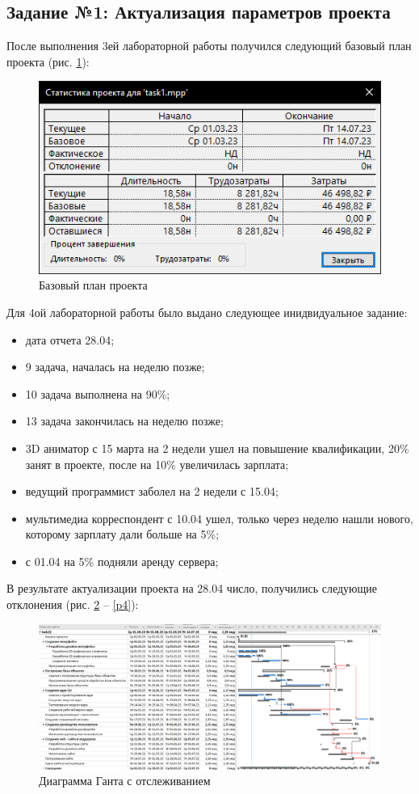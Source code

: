 \newpage
\subsection*{Задание №1: Актуализация параметров проекта}
После выполнения 3ей лабораторной работы получился следующий базовый план проекта (рис. \ref{p1}):
\begin{figure}[!h]
	\centering
	\includegraphics[width=0.7\linewidth]{inc/img/1.png}
	\caption{Базовый план проекта}
	\label{p1}
\end{figure}

Для 4ой лабораторной работы было выдано следующее инидвидуальное задание:

\begin{itemize}
	\item дата отчета 28.04;
	\item 9 задача, началась на неделю позже;
	\item 10 задача выполнена на 90\%;
	\item 13 задача закончилась на неделю позже;
	\item 3D аниматор с 15 марта на 2 недели ушел на повышение квалификации, 20\% занят в проекте, после на 10\% увеличилась зарплата;
	\item ведущий программист заболел на 2 недели с 15.04;
	\item мультимедиа корреспондент с 10.04 ушел, только через неделю нашли нового, которому зарплату дали больше на 5\%;
	\item с 01.04 на 5\% подняли аренду сервера;
\end{itemize}

\newpage
В результате актуализации проекта на 28.04 число, получились следующие отклонения (рис. \ref{p2} -- \ref{p4}):
\begin{figure}[!h]
	\centering
	\includegraphics[width=1\linewidth]{inc/img/2.png}
	\caption{Диаграмма Ганта с отслеживанием}
	\label{p2}
\end{figure}

